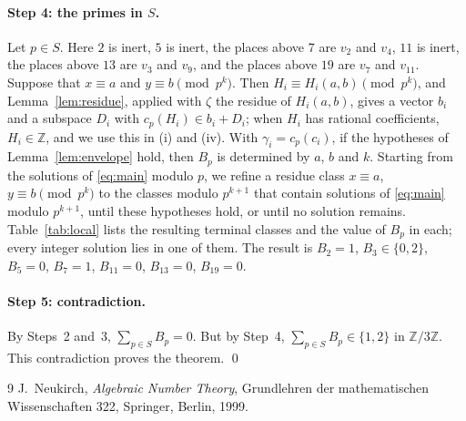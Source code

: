 \documentclass[11pt]{article}
\newcommand{\Z}{\mathbb{Z}}
\begin{document}
\paragraph{Step 4: the primes in $S$.} Let $p\in S$. Here $2$ is inert, $5$ is inert, the places above $7$ are $v_{2}$ and $v_{4}$, $11$ is inert, the places above $13$ are $v_{3}$ and $v_{9}$, and the places above $19$ are $v_{7}$ and $v_{11}$. Suppose that $x\equiv a$ and $y\equiv b\pmod{p^k}$. Then $H_i\equiv H_i(a,b)\pmod{p^k}$, and Lemma~\ref{lem:residue}, applied with $\zeta$ the residue of $H_i(a,b)$, gives a vector $b_i$ and a subspace $D_i$ with $c_p(H_i)\in b_i+D_i$; when $H_i$ has rational coefficients, $H_i\in\Z$, and we use this in (i) and (iv). With $\gamma_i=c_p(c_i)$, if the hypotheses of Lemma~\ref{lem:envelope} hold, then $B_p$ is determined by $a$, $b$ and $k$. Starting from the solutions of \eqref{eq:main} modulo $p$, we refine a residue class $x\equiv a$, $y\equiv b\pmod{p^k}$ to the classes modulo $p^{k+1}$ that contain solutions of \eqref{eq:main} modulo $p^{k+1}$, until these hypotheses hold, or until no solution remains. Table~\ref{tab:local} lists the resulting terminal classes and the value of $B_p$ in each; every integer solution lies in one of them. The result is $B_{2}=1$, $B_{3}\in\{0,2\}$, $B_{5}=0$, $B_{7}=1$, $B_{11}=0$, $B_{13}=0$, $B_{19}=0$.

\paragraph{Step 5: contradiction.} By Steps~2 and~3, $\sum_{p\in S}B_p=0$. But by Step~4, $\sum_{p\in S}B_p\in\{1,2\}$ in $\Z/3\Z$. This contradiction proves the theorem.
\qed


\begin{thebibliography}{9}
 J.~Neukirch, \emph{Algebraic Number Theory}, Grundlehren der mathematischen Wissenschaften 322, Springer, Berlin, 1999.
\end{thebibliography}
\end{document}

